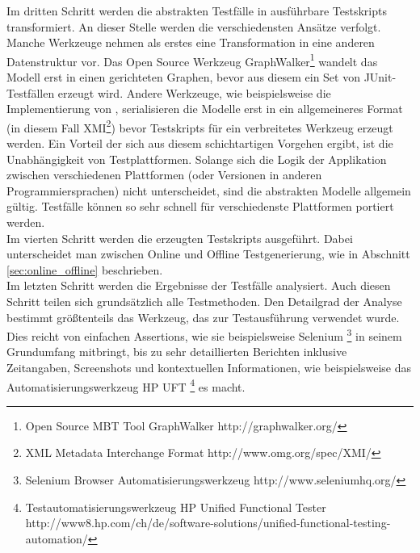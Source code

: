 Im dritten Schritt werden die abstrakten Testfälle in ausführbare Testskripts transformiert. An dieser Stelle werden die verschiedensten Ansätze verfolgt. Manche Werkzeuge nehmen als erstes eine Transformation in eine anderen Datenstruktur vor. Das Open Source Werkzeug GraphWalker\footnote{Open Source \Gls{MBT} Tool GraphWalker http://graphwalker.org/} wandelt das Modell erst in einen gerichteten Graphen, bevor aus diesem ein Set von JUnit-Testfällen erzeugt wird. Andere Werkzeuge, wie beispielsweise die Implementierung von \citeauthor{pinheiro_model-based_2013}\cite{pinheiro_model-based_2013}, serialisieren die Modelle erst in ein allgemeineres Format (in diesem Fall XMI\footnote{XML Metadata Interchange Format http://www.omg.org/spec/XMI/}) bevor Testskripts für ein verbreitetes Werkzeug erzeugt werden. Ein Vorteil der sich aus diesem schichtartigen Vorgehen ergibt, ist die Unabhängigkeit von Testplattformen. Solange sich die Logik der Applikation zwischen verschiedenen Plattformen (oder Versionen in anderen Programmiersprachen) nicht unterscheidet, sind die abstrakten Modelle allgemein gültig. Testfälle können so sehr schnell für verschiedenste Plattformen portiert werden.\\
Im vierten Schritt werden die erzeugten Testskripts ausgeführt. Dabei unterscheidet man zwischen Online und Offline Testgenerierung, wie in Abschnitt \ref{sec:online_offline} beschrieben.\\
Im letzten Schritt werden die Ergebnisse der Testfälle analysiert. Auch diesen Schritt teilen sich grundsätzlich alle Testmethoden. Den Detailgrad der Analyse bestimmt größtenteils das Werkzeug, das zur Testausführung verwendet wurde. Dies reicht von einfachen Assertions, wie sie beispielsweise Selenium \footnote{Selenium Browser Automatisierungswerkzeug http://www.seleniumhq.org/} in seinem Grundumfang mitbringt, bis zu sehr detaillierten Berichten inklusive Zeitangaben, Screenshots und kontextuellen Informationen, wie beispielsweise das Automatisierungswerkzeug HP UFT \footnote{Testautomatisierungswerkzeug HP Unified Functional Tester http://www8.hp.com/ch/de/software-solutions/unified-functional-testing-automation/} es macht.


